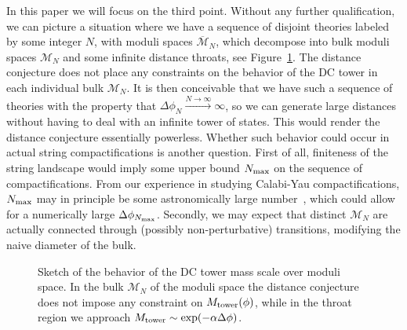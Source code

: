 \documentclass[11pt,a4paper]{article}
\numberwithin{equation}{section}
\numberwithin{table}{section}\setlength{\multlinegap}{25pt}
\begin{document}
In this paper we will focus on the third point. Without any further qualification, we can picture a situation where we have a sequence of disjoint theories labeled by some integer $N$, with moduli spaces $\overline{\mathcal{M}}_N$, which decompose into bulk moduli spaces $\mathcal{M}_N$ and some infinite distance throats, see Figure~\ref{fig:RDCModuliSpace}. The distance conjecture does not place any constraints on the behavior of the DC tower in each individual bulk $\mathcal{M}_N$. It is then conceivable that we have such a sequence of theories with the property that $\Delta\phi_N\overset{N\to\infty}{\longrightarrow}\infty$, so we can generate large distances without having to deal with an infinite tower of states. This would render the distance conjecture essentially powerless. Whether such behavior could occur in actual string compactifications is another question. First of all, finiteness of the string landscape would imply some upper bound $N_\textup{max}$ on the sequence of compactifications. From our experience in studying Calabi-Yau compactifications, $N_\textup{max}$ may in principle be some astronomically large number~\cite{Demirtas:2020dbm}, which could allow for a numerically large $\Delta\phi_{N_\textup{max}}$. Secondly, we may expect that distinct $\mathcal{M}_N$ are actually connected through (possibly non-perturbative) transitions, modifying the naive diameter of the bulk.
\begin{figure}
    \centering
    \caption{Sketch of the behavior of the DC tower mass scale over moduli space. In the bulk $\mathcal{M}_N$ of the moduli space the distance conjecture does not impose any constraint on $M_\textup{tower}(\phi)$, while in the throat region we approach $M_\textup{tower}\sim \exp(-\alpha\Delta\phi)$.}
    \label{fig:RDCModuliSpace}
\end{figure}
\end{document}

